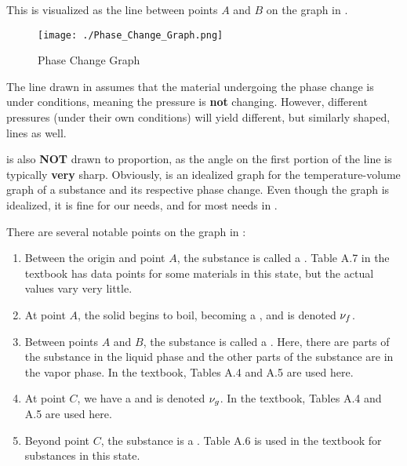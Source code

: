 This is visualized as the line between points $A$ and $B$ on the graph in .

\begin{figure}[h!tbp]
  \centering
  \texttt{[image: ./Phase\_Change\_Graph.png]}
  \caption{Phase Change Graph}
  \label{fig:Phase_Change}
\end{figure}

The line drawn in  assumes that the material undergoing the phase change is under  conditions, meaning the pressure is \textbf{not} changing.
However, different pressures (under their own  conditions) will yield different, but similarly shaped, lines as well.

\begin{remark*}
   is also \textbf{NOT} drawn to proportion, as the angle on the first portion of the line is typically \textbf{very} sharp.
  Obviously,  is an idealized graph for the temperature-volume graph of a substance and its respective phase change.
  Even though the graph is idealized, it is fine for our needs, and for most needs in .
\end{remark*}

There are several notable points on the graph in :
\begin{enumerate}[noitemsep]
\item Between the origin and point $A$, the substance is called a .
  Table A.7 in the textbook has data points for some materials in this state, but the actual values vary very little.
\item At point $A$, the solid begins to boil, becoming a , and is denoted $\nu_{f}$.
\item Between points $A$ and $B$, the substance is called a .
  Here, there are parts of the substance in the liquid phase and the other parts of the substance are in the vapor phase.
  In the textbook, Tables A.4 and A.5 are used here.
\item At point $C$, we have a  and is denoted $\nu_{g}$.
  In the textbook, Tables A.4 and A.5 are used here.
\item Beyond point $C$, the substance is a .
  Table A.6 is used in the textbook for substances in this state.
\end{enumerate}


